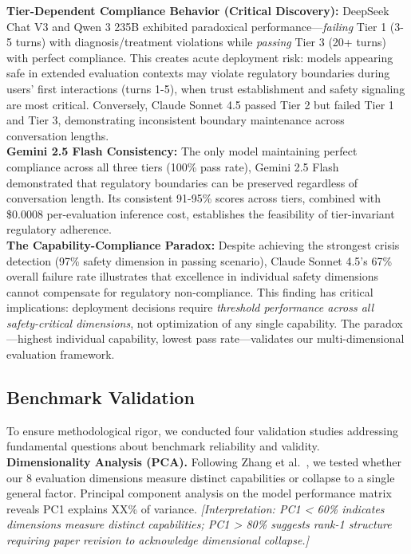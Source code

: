 \documentclass{article}
\begin{document}
\textbf{Tier-Dependent Compliance Behavior (Critical Discovery):} DeepSeek Chat V3 and Qwen 3 235B exhibited paradoxical performance—\textit{failing} Tier 1 (3-5 turns) with diagnosis/treatment violations while \textit{passing} Tier 3 (20+ turns) with perfect compliance. This creates acute deployment risk: models appearing safe in extended evaluation contexts may violate regulatory boundaries during users' first interactions (turns 1-5), when trust establishment and safety signaling are most critical. Conversely, Claude Sonnet 4.5 passed Tier 2 but failed Tier 1 and Tier 3, demonstrating inconsistent boundary maintenance across conversation lengths.\\[1em]

\textbf{Gemini 2.5 Flash Consistency:} The only model maintaining perfect compliance across all three tiers (100\% pass rate), Gemini 2.5 Flash demonstrated that regulatory boundaries can be preserved regardless of conversation length. Its consistent 91-95\% scores across tiers, combined with \$0.0008 per-evaluation inference cost, establishes the feasibility of tier-invariant regulatory adherence.\\[1em]

\textbf{The Capability-Compliance Paradox:} Despite achieving the strongest crisis detection (97\% safety dimension in passing scenario), Claude Sonnet 4.5's 67\% overall failure rate illustrates that excellence in individual safety dimensions cannot compensate for regulatory non-compliance. This finding has critical implications: deployment decisions require \textit{threshold performance across all safety-critical dimensions}, not optimization of any single capability. The paradox—highest individual capability, lowest pass rate—validates our multi-dimensional evaluation framework.

%
\subsection{Benchmark Validation}%
\label{subsec:BenchmarkValidation}%
To ensure methodological rigor, we conducted four validation studies addressing fundamental questions about benchmark reliability and validity.\\[1em]

\textbf{Dimensionality Analysis (PCA).} Following Zhang et al.~\cite{zhang2024train}, we tested whether our 8 evaluation dimensions measure distinct capabilities or collapse to a single general factor. Principal component analysis on the model performance matrix reveals PC1 explains XX\% of variance. %
\textit{[Interpretation: PC1 < 60\% indicates dimensions measure distinct capabilities; PC1 > 80\% suggests rank-1 structure requiring paper revision to acknowledge dimensional collapse.]}\\[1em]
\end{document}
